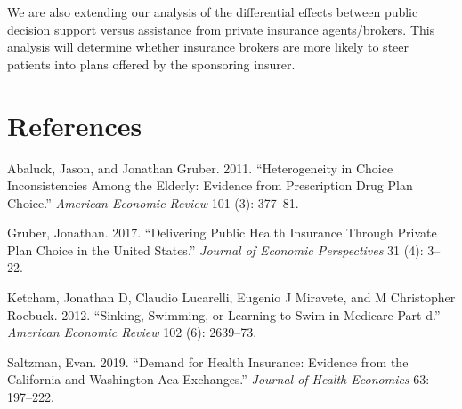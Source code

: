 \documentclass[
  12pt,
]{article}
\newlength{\cslhangindent}
\newenvironment{cslreferences}%
  {\setlength{\parindent}{0pt}%
  \everypar{\setlength{\hangindent}{\cslhangindent}}\ignorespaces}%
  {\par}
\begin{document}
We are also extending our analysis of the differential effects between public decision support versus assistance from private insurance agents/brokers. This analysis will determine whether insurance brokers are more likely to steer patients into plans offered by the sponsoring insurer.

\hypertarget{references}{%
\section*{References}\label{references}}

\hypertarget{refs}{}
\begin{cslreferences}
\leavevmode\hypertarget{ref-abaluck2011}{}%
Abaluck, Jason, and Jonathan Gruber. 2011. ``Heterogeneity in Choice Inconsistencies Among the Elderly: Evidence from Prescription Drug Plan Choice.'' \emph{American Economic Review} 101 (3): 377--81.

\leavevmode\hypertarget{ref-gruber2017}{}%
Gruber, Jonathan. 2017. ``Delivering Public Health Insurance Through Private Plan Choice in the United States.'' \emph{Journal of Economic Perspectives} 31 (4): 3--22.

\leavevmode\hypertarget{ref-ketcham2012}{}%
Ketcham, Jonathan D, Claudio Lucarelli, Eugenio J Miravete, and M Christopher Roebuck. 2012. ``Sinking, Swimming, or Learning to Swim in Medicare Part d.'' \emph{American Economic Review} 102 (6): 2639--73.

\leavevmode\hypertarget{ref-saltzman2019}{}%
Saltzman, Evan. 2019. ``Demand for Health Insurance: Evidence from the California and Washington Aca Exchanges.'' \emph{Journal of Health Economics} 63: 197--222.
\end{cslreferences}
\end{document}
